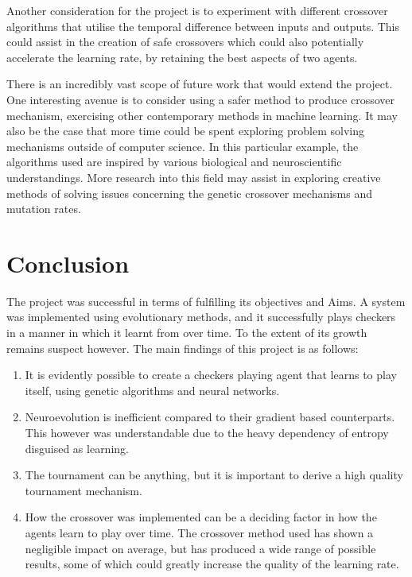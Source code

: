 \documentclass[12pt,a4paper]{article}
\begin{document}
        Another consideration for the project is to experiment with different crossover algorithms that utilise the temporal difference between inputs and outputs. This could assist in the creation of safe crossovers which could also potentially accelerate the learning rate, by retaining the best aspects of two agents.
        
        There is an incredibly vast scope of future work that would extend the project. One interesting avenue is to consider using a safer method to produce crossover mechanism, exercising other contemporary methods in machine learning. It may also be the case that more time could be spent exploring problem solving mechanisms  outside of computer science. In this particular example, the algorithms used are inspired by various biological and neuroscientific understandings. More research into this field may assist in exploring creative methods of solving issues concerning the genetic crossover mechanisms and mutation rates.
    


\section{Conclusion}

    The project was successful in terms of fulfilling its objectives and Aims. A system was implemented using evolutionary methods, and it successfully plays checkers in a manner in which it learnt from over time. To the extent of its growth remains suspect however. 
    The main findings of this project is as follows:

    \begin{enumerate}
    \item It is evidently possible to create a checkers playing agent that learns to play itself, using genetic algorithms and neural networks.
    \item  Neuroevolution is inefficient compared to their gradient based counterparts. This however was understandable due to the heavy dependency of entropy disguised as learning.
    \item  The tournament can be anything, but it is important to derive a high quality tournament mechanism.
    \item How the crossover was implemented can be a deciding factor in how the agents learn to play over time. The crossover method used has shown a negligible impact on average, but has produced a wide range of possible results, some of which could greatly increase the quality of the learning rate.
    \end{enumerate}
\end{document}
